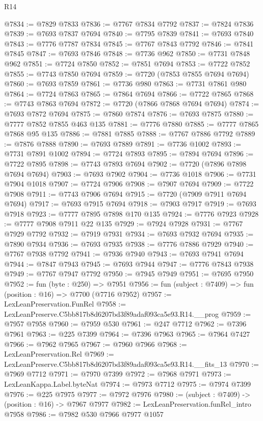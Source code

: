 \begin{lexlean}{R14}
\begin{coremodule}
@7834 := @7829 @7833
@7836 := @7767 @7834 @7792
@7837 := @7824 @7836
@7839 := @7693 @7837 @7694
@7840 := @7795 @7839
@7841 := @7693 @7840
@7843 := @7776 @7787 @7834
@7845 := @7767 @7843 @7792
@7846 := @7841 @7845
@7847 := @7693 @7846
@7848 := @7736 @962
@7850 := @7731 @7848 @962
@7851 := @7724 @7850
@7852 := @7851 @7694
@7853 := @7722 @7852
@7855 := @7743 @7850 @7694
@7859 := @7720 (@7853 @7855 @7694 @7694)
@7860 := @7693 @7859
@7861 := @7736 @980
@7863 := @7731 @7861 @980
@7864 := @7724 @7863
@7865 := @7864 @7694
@7866 := @7722 @7865
@7868 := @7743 @7863 @7694
@7872 := @7720 (@7866 @7868 @7694 @7694)
@7874 := @7693 @7872 @7694
@7875 := @7860 @7874
@7876 := @7693 @7875
@7880 := @7777 @7852 @7855 @463 @135
@7881 := @7776 @7880
@7885 := @7777 @7865 @7868 @95 @135
@7886 := @7881 @7885
@7888 := @7767 @7886 @7792
@7889 := @7876 @7888
@7890 := @7693 @7889
@7891 := @7736 @1002
@7893 := @7731 @7891 @1002
@7894 := @7724 @7893
@7895 := @7894 @7694
@7896 := @7722 @7895
@7898 := @7743 @7893 @7694
@7902 := @7720 (@7896 @7898 @7694 @7694)
@7903 := @7693 @7902
@7904 := @7736 @1018
@7906 := @7731 @7904 @1018
@7907 := @7724 @7906
@7908 := @7907 @7694
@7909 := @7722 @7908
@7911 := @7743 @7906 @7694
@7915 := @7720 (@7909 @7911 @7694 @7694)
@7917 := @7693 @7915 @7694
@7918 := @7903 @7917
@7919 := @7693 @7918
@7923 := @7777 @7895 @7898 @170 @135
@7924 := @7776 @7923
@7928 := @7777 @7908 @7911 @22 @135
@7929 := @7924 @7928
@7931 := @7767 @7929 @7792
@7932 := @7919 @7931
@7934 := @7693 @7932 @7694
@7935 := @7890 @7934
@7936 := @7693 @7935
@7938 := @7776 @7886 @7929
@7940 := @7767 @7938 @7792
@7941 := @7936 @7940
@7943 := @7693 @7941 @7694
@7944 := @7847 @7943
@7945 := @7693 @7944
@7947 := @7776 @7843 @7938
@7949 := @7767 @7947 @7792
@7950 := @7945 @7949
@7951 := @7695 @7950
@7952 := fun (byte : @250) => @7951
@7956 := fun (subject : @7409) => fun (position : @16) => @7700 (@7716 @7952)
@7957 := LexLeanPreservation.FunRel
@7958 := LexLeanPreserve.C5bb817b8d6207bd3f89adaf093ca5e93.R14.__prog
@7959 := @7957 @7958
@7960 := @7959 @530
@7961 := @247 @7712
@7962 := @7396 @7961
@7963 := @225 @7399
@7964 := @7396 @7963
@7965 := @7964 @7427
@7966 := @7962 @7965
@7967 := @7960 @7966
@7968 := LexLeanPreservation.Rel
@7969 := LexLeanPreserve.C5bb817b8d6207bd3f89adaf093ca5e93.R14.__fits_13
@7970 := @7969 @7712
@7971 := @7970 @7399
@7972 := @7968 @7971
@7973 := LexLeanKappa.Label.byteNat
@7974 := @7973 @7712
@7975 := @7974 @7399
@7976 := @225 @7975
@7977 := @7972 @7976
@7980 := (subject : @7409) -> (position : @16) -> @7967 @7977
@7982 := LexLeanPreservation.funRel_intro @7958
@7986 := @7982 @530 @7966 @7977 @1057

\end{coremodule}
\end{lexlean}
